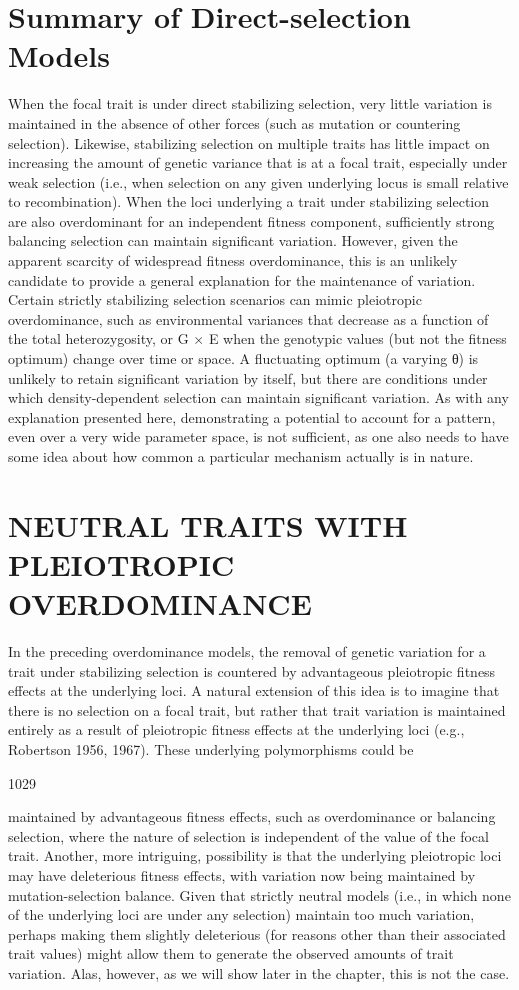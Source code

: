 \documentclass{article}
\begin{document}
\section{Summary of Direct-selection Models}
When the focal trait is under direct stabilizing selection, very little variation is maintained in the absence of other forces (such as mutation or countering selection). Likewise, stabilizing selection on multiple traits has little impact on increasing the amount of genetic variance that is at a focal trait, especially under weak selection (i.e., when selection on any given underlying locus is small relative to recombination). When the loci underlying a trait under stabilizing selection are also overdominant for an independent fitness component, sufficiently strong balancing selection can maintain significant variation. However, given the apparent scarcity of widespread fitness overdominance, this is an unlikely candidate to provide a general explanation for the maintenance of variation. Certain strictly stabilizing selection scenarios can mimic pleiotropic overdominance, such as environmental variances that decrease as a function of the total heterozygosity, or G × E when the genotypic values (but not the fitness optimum) change over time or space. A fluctuating optimum (a varying θ) is unlikely to retain significant variation by itself, but there are conditions under which density-dependent selection can maintain significant variation. As with any explanation presented here, demonstrating a potential to account for a pattern, even over a very wide parameter space, is not sufficient, as one also needs to have some idea about how common a particular mechanism actually is in nature.

\section{NEUTRAL TRAITS WITH PLEIOTROPIC OVERDOMINANCE}
In the preceding overdominance models, the removal of genetic variation for a trait under stabilizing selection is countered by advantageous pleiotropic fitness effects at the underlying loci. A natural extension of this idea is to imagine that there is no selection on a focal trait, but rather that trait variation is maintained entirely as a result of pleiotropic fitness effects at the underlying loci (e.g., Robertson 1956, 1967). These underlying polymorphisms could be

1029

maintained by advantageous fitness effects, such as overdominance or balancing selection, where the nature of selection is independent of the value of the focal trait. Another, more intriguing, possibility is that the underlying pleiotropic loci may have deleterious fitness effects, with variation now being maintained by mutation-selection balance. Given that strictly neutral models (i.e., in which none of the underlying loci are under any selection) maintain too much variation, perhaps making them slightly deleterious (for reasons other than their associated trait values) might allow them to generate the observed amounts of trait variation. Alas, however, as we will show later in the chapter, this is not the case.
\end{document}
